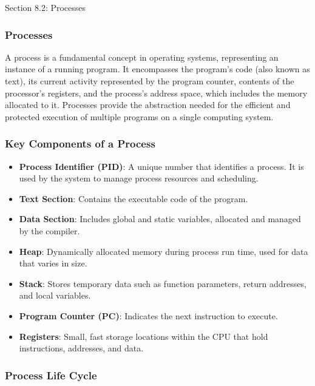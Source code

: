 \begin{notes}{Section 8.2: Processes}
    \subsubsection*{Processes}

    A process is a fundamental concept in operating systems, representing an instance of a running program. It encompasses the program's code (also known as text), its current activity represented by 
    the program counter, contents of the processor's registers, and the process's address space, which includes the memory allocated to it. Processes provide the abstraction needed for the efficient 
    and protected execution of multiple programs on a single computing system. \vspace*{1em}
    
    \subsubsection*{Key Components of a Process}
    
    \begin{itemize}
        \item \textbf{Process Identifier (PID)}: A unique number that identifies a process. It is used by the system to manage process resources and scheduling.
        \item \textbf{Text Section}: Contains the executable code of the program.
        \item \textbf{Data Section}: Includes global and static variables, allocated and managed by the compiler.
        \item \textbf{Heap}: Dynamically allocated memory during process run time, used for data that varies in size.
        \item \textbf{Stack}: Stores temporary data such as function parameters, return addresses, and local variables.
        \item \textbf{Program Counter (PC)}: Indicates the next instruction to execute.
        \item \textbf{Registers}: Small, fast storage locations within the CPU that hold instructions, addresses, and data.
    \end{itemize}
    
    \subsubsection*{Process Life Cycle}
    

\end{notes}
